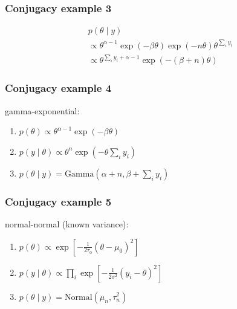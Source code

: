 \documentclass{beamer}
\begin{document}

\begin{frame}[fragile]
\frametitle{Conjugacy example 3}


\begin{align*}
&p(\theta \mid y)\\
&\propto \theta^{\alpha - 1}\exp\left( - \beta \theta \right) \exp(-n\theta) \theta^{\sum_i y_i} \\
&\propto \theta^{\sum_i y_i + \alpha - 1}\exp\left( - (\beta +n)\theta \right)
\end{align*}

\end{frame}


\begin{frame}[fragile]
\frametitle{Conjugacy example 4}


gamma-exponential:
\begin{enumerate}
\item $p(\theta) \propto \theta^{\alpha - 1}\exp\left( - \beta \theta \right)$
\item $p(y \mid \theta) \propto \theta^n  \exp\left(- \theta \sum_i y_i\right)$
\item $p(\theta \mid y)  = \text{Gamma}(\alpha + n, \beta + \sum_i y_i)$
\end{enumerate}


\end{frame}


\begin{frame}[fragile]
\frametitle{Conjugacy example 5}


normal-normal (known variance):
\begin{enumerate}
\item $p(\theta) \propto \exp\left[-\frac{1}{2 \tau_0}(\theta - \mu_0)^2 \right]$
\item $p(y \mid \theta) \propto \prod_i \exp\left[-\frac{1}{2 \sigma^2} \left(y_i - \theta \right)^2 \right] $
\item $p(\theta \mid y) = \text{Normal}(\mu_n, \tau_n^2)$
\end{enumerate}


\end{frame}
\end{document}
